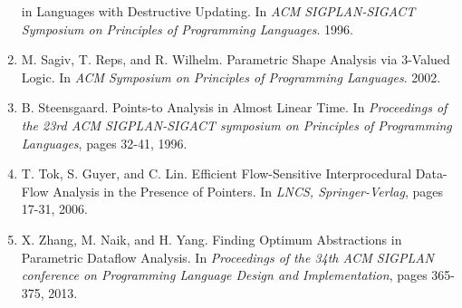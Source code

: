 \documentclass{article}
\begin{document}
\begin{enumerate}[1.]
        in Languages with Destructive Updating. In \textit{ACM
        SIGPLAN-SIGACT Symposium on Principles of Programming Languages}.
        1996.
    \item M. Sagiv, T. Reps, and R. Wilhelm. Parametric Shape Analysis via
        3-Valued Logic. In \textit{ACM Symposium on Principles of
        Programming Languages}. 2002.
    \item B. Steensgaard. Points-to Analysis in Almost Linear Time. In
        \textit{Proceedings of the 23rd ACM SIGPLAN-SIGACT symposium on
        Principles of Programming Languages}, pages 32-41, 1996.
    \item T. Tok, S. Guyer, and C. Lin. Efficient Flow-Sensitive
        Interprocedural Data-Flow Analysis in the Presence of Pointers. In
        \textit{LNCS, Springer-Verlag}, pages 17-31, 2006.
    \item X. Zhang, M. Naik, and H. Yang. Finding Optimum Abstractions in
        Parametric Dataflow Analysis. In \textit{Proceedings of the 34th ACM
        SIGPLAN conference on Programming Language Design and
        Implementation}, pages 365-375, 2013.
\end{enumerate}
\end{document}
